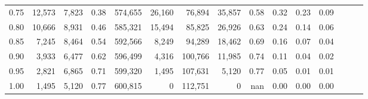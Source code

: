 \begin{tabular}{rrrrrrrrrrrrrrr}
0.75 &  12,573 &   7,823 &  0.38 &  574,655 &   26,160 &   76,894 &   35,857 &  0.58 &  0.32 &  0.23 &      0.09 \\
0.80 &  10,666 &   8,931 &  0.46 &  585,321 &   15,494 &   85,825 &   26,926 &  0.63 &  0.24 &  0.14 &      0.06 \\
0.85 &   7,245 &   8,464 &  0.54 &  592,566 &    8,249 &   94,289 &   18,462 &  0.69 &  0.16 &  0.07 &      0.04 \\
0.90 &   3,933 &   6,477 &  0.62 &  596,499 &    4,316 &  100,766 &   11,985 &  0.74 &  0.11 &  0.04 &      0.02 \\
0.95 &   2,821 &   6,865 &  0.71 &  599,320 &    1,495 &  107,631 &    5,120 &  0.77 &  0.05 &  0.01 &      0.01 \\
1.00 &   1,495 &   5,120 &  0.77 &  600,815 &        0 &  112,751 &        0 &   nan &  0.00 &  0.00 &      0.00 \\
\bottomrule
\end{tabular}
